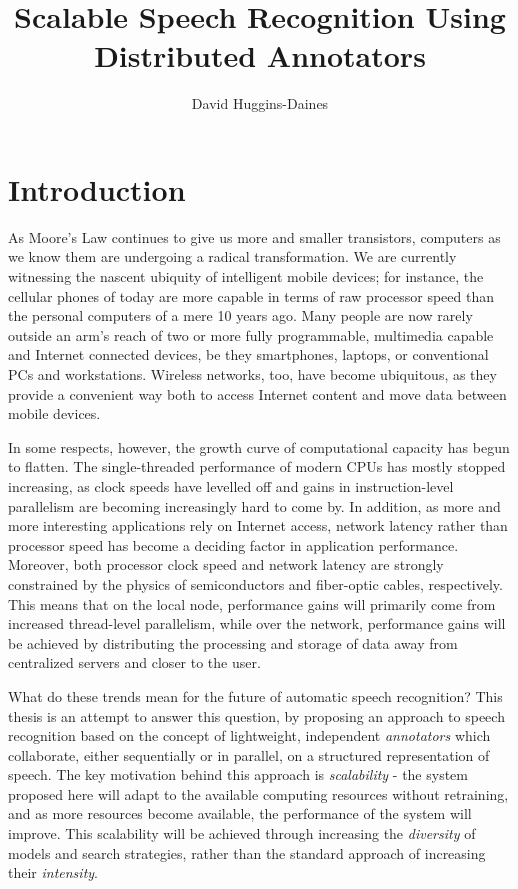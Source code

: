 \documentclass{article}
\title{Scalable Speech Recognition Using Distributed Annotators}
\author{David Huggins-Daines}
\begin{document}
\maketitle

\begin{abstract}


\end{abstract}

\tableofcontents{}

\section{Introduction}
\label{sec:intro}

As Moore's Law continues to give us more and smaller transistors,
computers as we know them are undergoing a radical transformation.  We
are currently witnessing the nascent ubiquity of intelligent mobile
devices; for instance, the cellular phones of today are more capable
in terms of raw processor speed than the personal computers of a mere
10 years ago.  Many people are now rarely outside an arm's reach of
two or more fully programmable, multimedia capable and Internet
connected devices, be they smartphones, laptops, or conventional PCs
and workstations.  Wireless networks, too, have become ubiquitous, as
they provide a convenient way both to access Internet content and move
data between mobile devices.

In some respects, however, the growth curve of computational capacity
has begun to flatten.  The single-threaded performance of modern CPUs
has mostly stopped increasing, as clock speeds have levelled off and
gains in instruction-level parallelism are becoming increasingly hard
to come by.  In addition, as more and more interesting applications
rely on Internet access, network latency rather than processor speed
has become a deciding factor in application performance.  Moreover,
both processor clock speed and network latency are strongly
constrained by the physics of semiconductors and fiber-optic cables,
respectively.  This means that on the local node, performance gains
will primarily come from increased thread-level parallelism, while
over the network, performance gains will be achieved by distributing
the processing and storage of data away from centralized servers and
closer to the user.

What do these trends mean for the future of automatic speech
recognition?  This thesis is an attempt to answer this question, by
proposing an approach to speech recognition based on the concept of
lightweight, independent {\em annotators} which collaborate, either
sequentially or in parallel, on a structured representation of speech.
The key motivation behind this approach is {\em scalability} - the
system proposed here will adapt to the available computing resources
without retraining, and as more resources become available, the
performance of the system will improve.  This scalability will be
achieved through increasing the {\em diversity} of models and search
strategies, rather than the standard approach of increasing their {\em
  intensity}.
\end{document}
